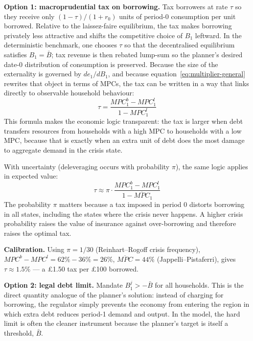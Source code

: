 \documentclass[11pt,a4paper]{article}
\begin{document}
\textbf{Option 1: macroprudential tax on borrowing.} Tax borrowers at rate $\tau$ so they receive only $(1-\tau)/(1+r_0)$ units of period-0 consumption per unit borrowed. Relative to the laissez-faire equilibrium, the tax makes borrowing privately less attractive and shifts the competitive choice of $B_1$ leftward. In the deterministic benchmark, one chooses $\tau$ so that the decentralised equilibrium satisfies $B_1=\bar{B}$; tax revenue is then rebated lump-sum so the planner's desired date-0 distribution of consumption is preserved. Because the size of the externality is governed by $de_1/dB_1$, and because equation~\eqref{eq:multiplier-general} rewrites that object in terms of MPCs, the tax can be written in a way that links directly to observable household behaviour:
\begin{equation}
\tau = \frac{MPC_1^b - MPC_1^l}{1 - MPC_1^l}
\end{equation}
This formula makes the economic logic transparent: the tax is larger when debt transfers resources from households with a high MPC to households with a low MPC, because that is exactly when an extra unit of debt does the most damage to aggregate demand in the crisis state.

With uncertainty (deleveraging occurs with probability $\pi$), the same logic applies in expected value:
\begin{equation}
\tau \approx \pi \cdot \frac{MPC_1^b - MPC_1^l}{1 - \overline{MPC}_1}
\end{equation}
The probability $\pi$ matters because a tax imposed in period 0 distorts borrowing in all states, including the states where the crisis never happens. A higher crisis probability raises the value of insurance against over-borrowing and therefore raises the optimal tax.

\textbf{Calibration.} Using $\pi = 1/30$ (Reinhart--Rogoff crisis frequency), $MPC^b - MPC^l = 62\% - 36\% = 26\%$, $\overline{MPC} = 44\%$ (Jappelli--Pistaferri), gives $\tau \approx 1.5\%$ --- a \pounds 1.50 tax per \pounds 100 borrowed.

\textbf{Option 2: legal debt limit.} Mandate $B_1^j > -\bar{B}$ for all households. This is the direct quantity analogue of the planner's solution: instead of charging for borrowing, the regulator simply prevents the economy from entering the region in which extra debt reduces period-1 demand and output. In the model, the hard limit is often the cleaner instrument because the planner's target is itself a threshold, $\bar{B}$.
\end{document}
